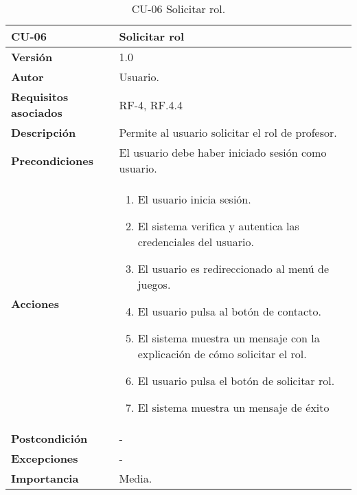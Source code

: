 \begin{table}[h!]
	\centering
	\begin{tabularx}{\linewidth}{ p{} p{} }
		\toprule
		\textbf{CU-06}    & \textbf{Solicitar rol}\\
		\toprule
		\textbf{Versión}              & 1.0    \\
		\textbf{Autor}                & Usuario. \\
		\textbf{Requisitos asociados} & RF-4, RF.4.4 \\
		\textbf{Descripción}          & Permite al usuario solicitar el rol de profesor.\\
		\textbf{Precondiciones}         & El usuario debe haber iniciado sesión como usuario. \\
		\textbf{Acciones}             &
		\begin{enumerate}
			\def\labelenumi{\arabic{enumi}.}
			\tightlist
			\item El usuario inicia sesión.
            \item El sistema verifica y autentica las credenciales del usuario.
            \item El usuario es redireccionado al menú de juegos.
            \item El usuario pulsa al botón de contacto.
            \item El sistema muestra un mensaje con la explicación de cómo solicitar el rol.
            \item El usuario pulsa el botón de solicitar rol.
            \item El sistema muestra un mensaje de éxito
		\end{enumerate}\\
         \textbf{Postcondición}             & - \\
		\textbf{Excepciones}             & - \\
		\textbf{Importancia}          & Media. \\
		\bottomrule
	\end{tabularx}
	\caption{CU-06 Solicitar rol.}
\end{table}


